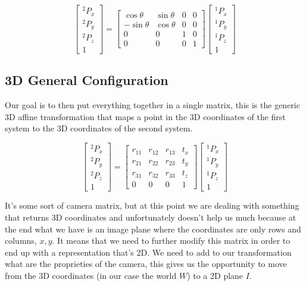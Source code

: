 \[
    \begin{bmatrix}
        {}^2P_x \\
        {}^2P_y \\
        {}^2P_z \\
        1
    \end{bmatrix}
    =
    \begin{bmatrix}
        \cos\theta & \sin\theta & 0 & 0 \\
        -\sin\theta & \cos\theta & 0 & 0 \\
        0 & 0 & 1 & 0 \\
        0 & 0 & 0 & 1
    \end{bmatrix}
    \begin{bmatrix}
        {}^1P_x \\
        {}^1P_y \\
        {}^1P_z \\
        1
    \end{bmatrix}   
\]

\subsection{3D General Configuration}

Our goal is to then put everything together in a single matrix, this is the generic 3D affine transformation that maps a point in the 3D coordinates of the first system to the 3D coordinates of the second system.

\[
    \begin{bmatrix}
        {}^2P_x \\
        {}^2P_y \\
        {}^2P_z \\
        1
    \end{bmatrix}
    =
    \begin{bmatrix}
       r_{11} & r_{12} & r_{13} & t_x \\
       r_{21} & r_{22} & r_{23} & t_y \\
       r_{31} & r_{32} & r_{33} & t_z \\
        0 & 0 & 0 & 1
    \end{bmatrix}
    \begin{bmatrix}
        {}^1P_x \\
        {}^1P_y \\
        {}^1P_z \\
        1
    \end{bmatrix}   
\]

It's some sort of camera matrix, but at this point we are dealing with something that returns 3D coordinates and unfortunately doesn't help us much because at the end what we have is an image plane where the coordinates are only rows and columns, \(x, y\). It means that we need to further modify this matrix in order to end up with a representation that's 2D. We need to add to our transformation what are the proprieties of the camera, this gives us the opportunity to move from the 3D coordinates (in our case the world \(W\)) to a 2D plane \(I\).


